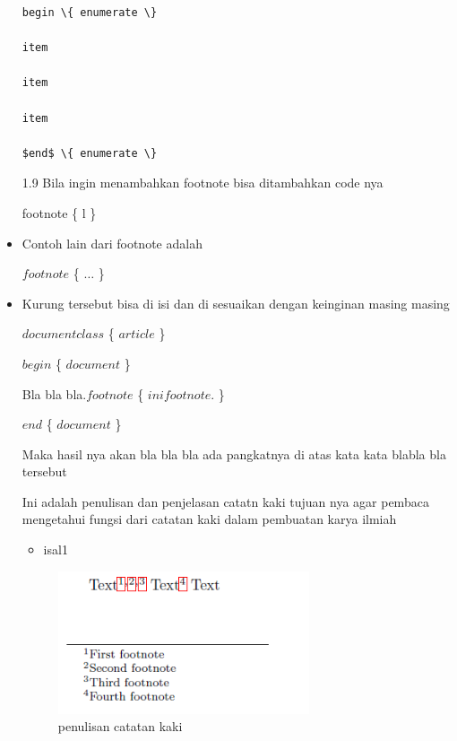 \begin{itemize}
\begin{verbatim}
begin \{ enumerate \}

item

item

item

$end$ \{ enumerate \}
\end{verbatim}

\vspace{\baselineskip}
1.9 Bila ingin menambahkan footnote bisa ditambahkan code nya\par

\vspace{\baselineskip}
footnote \{ l \} \par

\vspace{\baselineskip}
	\item Contoh lain dari footnote adalah\par

$footnote$ \{ $…$ \} \par

\vspace{\baselineskip}
	\item Kurung tersebut bisa di isi dan di sesuaikan dengan keinginan masing masing\par

$documentclass$ \{ $article$ \} \par

$begin$ \{ $document$ \} \par

Bla bla bla.$footnote$ \{ $ini footnote.$ \} \par

$end$ \{ $document$ \} \par

\vspace{\baselineskip}
Maka hasil nya akan bla bla bla ada pangkatnya di atas kata kata blabla bla tersebut\par

\vspace{\baselineskip}
Ini adalah penulisan dan penjelasan catatn kaki tujuan nya agar pembaca mengetahui fungsi dari catatan kaki dalam pembuatan karya ilmiah\par
\begin{itemize}
	\item isal1
\end{itemize}
\begin{figure}[ht]
	\centerline{\includegraphics[width=0.70\textwidth]{gambar/isal1}}
	\caption{penulisan catatan kaki}
	\label{catatan kaki}
\end{figure}

\end{itemize}
